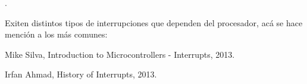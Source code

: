 \documentclass[12pt,a4paper]{report}
\begin{document}
      \cite{Irfan Ahmad 2014}.
   
   \vspace{1cm}
   
       Exiten distintos tipos de interrupciones que dependen del procesador, acá se hace mención a los más comunes:
       
       
       
       
    
         
    
        

\begin{thebibliography}{0}



   Mike Silva, Introduction to Microcontrollers - Interrupts, 2013.
  
   Irfan Ahmad, History of Interrupts, 2013.
  
\end{thebibliography}
\end{document}
